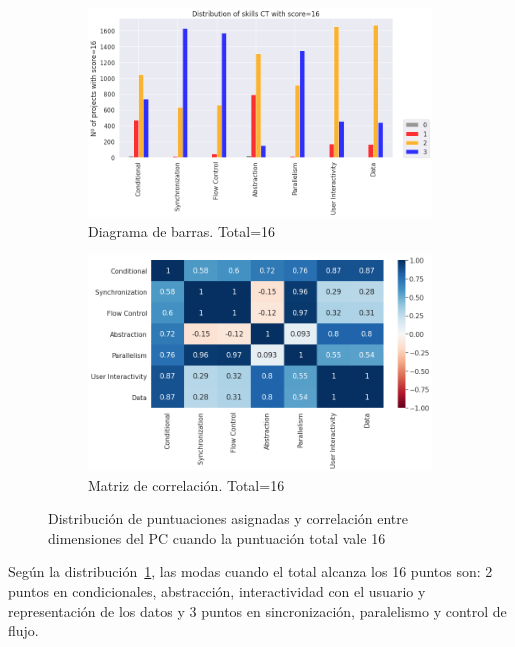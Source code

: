 \documentclass[a4paper, 12pt]{book}
\begin{document}
\begin{figure}[H]
    \centering
    \begin{subfigure}[h]{.49\textwidth} 
        \includegraphics[width=\textwidth]{img/distribucion_16_Snap}
        \caption{Diagrama de barras. Total=16}
        \label{fig:total16_Snap}
    \end{subfigure}       
    \begin{subfigure}[h]{.49\textwidth} 
        \includegraphics[width=\textwidth]{img/corr_16_Snap}
        \caption{Matriz de correlación. Total=16}
        \label{fig:corr16_Snap}
    \end{subfigure}
    \caption{Distribución de puntuaciones asignadas y correlación entre dimensiones del PC cuando la puntuación total vale 16}
\end{figure}

Según la distribución~\ref{fig:total16_Snap}, las modas cuando el total alcanza los 16 puntos son: 2 puntos en condicionales, abstracción, interactividad con el usuario y representación de los datos y 3 puntos en sincronización, paralelismo y control de flujo.
\end{document}
